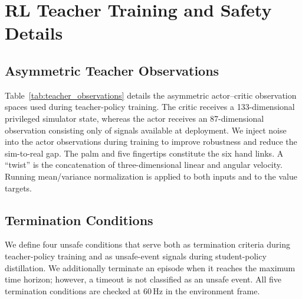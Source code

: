 \section{RL Teacher Training and Safety Details}
\label{app:rl_training_details}

\subsection{Asymmetric Teacher Observations}

Table~\ref{tab:teacher_observations} details the asymmetric actor--critic
observation spaces used during teacher-policy training. The critic receives a
133-dimensional privileged simulator state, whereas the actor receives an
87-dimensional observation consisting only of signals available at deployment.
We inject noise into the actor observations during training to improve
robustness and reduce the sim-to-real gap. The palm and five fingertips
constitute the six hand links. A ``twist'' is the concatenation of
three-dimensional linear and angular velocity. Running mean/variance
normalization is applied to both inputs and to the value targets.



\subsection{Termination Conditions}
We define four unsafe conditions that serve both as termination criteria during teacher-policy training and as unsafe-event signals during student-policy distillation. We additionally terminate an episode when it reaches the maximum time horizon; however, a timeout is not classified as an unsafe event. All five termination conditions are checked at \(60\,\text{Hz}\) in the environment frame.

